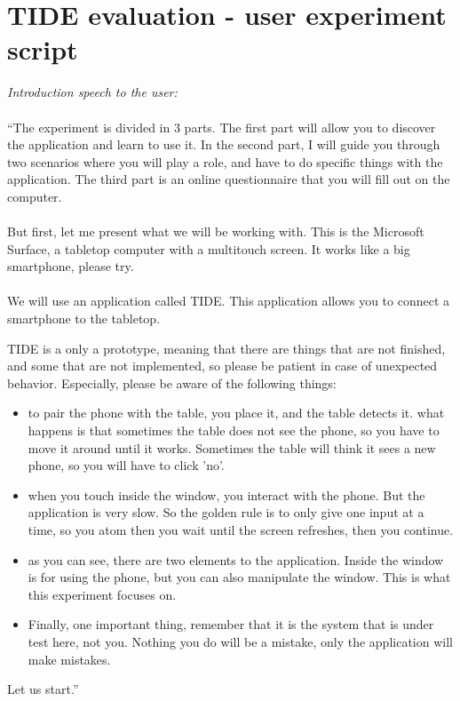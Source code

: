 \chapter{TIDE evaluation - user experiment script}
\label{app:evalscript}

\emph{Introduction speech to the user:}
\\\\
``The experiment is divided in 3 parts.
The first part will allow you to discover the application and learn to use it.
In the second part, I will guide you through two scenarios where you will play a role, and have to do specific things with the application.
The third part is an online questionnaire that you will fill out on the computer.
\\\\
But first, let me present what we will be working with.
This is the Microsoft Surface, a tabletop computer with a multitouch screen.
It works like a big smartphone, please try.
\\\\
We will use an application called TIDE.
This application allows you to connect a smartphone to the tabletop.

TIDE is a only a prototype, meaning that there are things that are not finished, and some that are not implemented, so please be patient in case of unexpected behavior.
Especially, please be aware of the following things:
\begin{itemize}
\item to pair the phone with the table, you place it, and the table detects it. what happens is that sometimes the table does not see the phone, so you have to move it around until it works. Sometimes the table will think it sees a new phone, so you will have to click 'no'.
\item when you touch inside the window, you interact with the phone. But the application is very slow. So the golden rule is to only give one input at a time, so you atom then you wait until the screen refreshes, then you continue.
\item as you can see, there are two elements to the application. Inside the window is for using the phone, but you can also manipulate the window. This is what this experiment focuses on.
\item Finally, one important thing, remember that it is the system that is under test here, not you. Nothing you do will be a mistake, only the application will make mistakes.
\end{itemize}
Let us start.''


